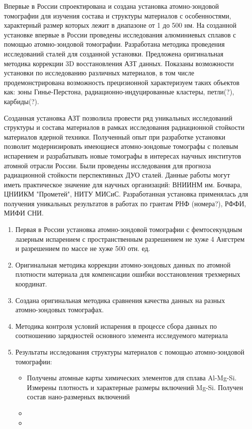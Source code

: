 {\novelty}
Впервые в России спроектирована и создана установка атомно-зондовой томографии для изучения состава и структуры материалов с особенностями, характерный размер которых лежит в диапазоне от 1 до 500 нм. На созданной установке впервые в России проведены исследования алюминиевых сплавов с помощью атомно-зондовой томографии. Разработана методика проведения исследований сталей для созданной установки. Предложена оригинальная методика коррекции 3D восстановления АЗТ данных. Показаны возможности установки по исследованию различных материалов, в том числе продемонстрирована возможность прецизионной характеризуем таких объектов как: зоны Гинье-Перстона, радиационно-индуцированные кластеры, петли(?), карбиды(?).

{\influence} Созданная установка АЗТ позволила провести ряд уникальных исследований структуры и состава материалов в рамках исследования радиационной стойкости материалов ядерной техники. Полученный опыт при разработке установки позволит модернизировать имеющиеся атомно-зондовые томографы с полевым испарением и разрабатывать новые томографы в интересах научных институтов атомной отрасли России. Были проведены исследования для прогноза радиационной стойкости перспективных ДУО сталей. Данные работы могут иметь практическое значение для научных организаций: ВНИИНМ им. Бочвара, ЦНИИКМ "Прометей", НИТУ МИСиС. Разработанная установка применялась для получения уникальных результатов в работах по грантам РНФ (номера?), РФФИ, МИФИ СНИ.

\clearpage
{}
\begin{enumerate}[beginpenalty=10000] %
  \item Первая в России установка атомно-зондовой томографии с фемтосекундным лазерным испарением с пространственным разрешением не хуже 4 Ангстрем и разрешением по массе не хуже 500 отн. ед.
  \item Оригинальная методика коррекции атомно-зондовых данных по атомной плотности материала для компенсации ошибки восстановления трехмерных координат.     
  \item Создана оригинальная методика сравнения качества данных на разных атомно-зондовых томографах.
  \item Методика контроля условий испарения в процессе сбора данных по соотношению зарядностей основного элемента исследуемого материала
  \item Результаты исследования структуры материалов с помощью атомно-зондовой томографии:
  \begin{itemize}
  	\item Получены атомные карты химических элементов для сплава Al-Mg-Si. Измерены плотность и характерные размеры включений Mg-Si. Получен состав нано-размерных включений
  	\item 
  	\item 
  \end{itemize}
  
  
\end{enumerate}

